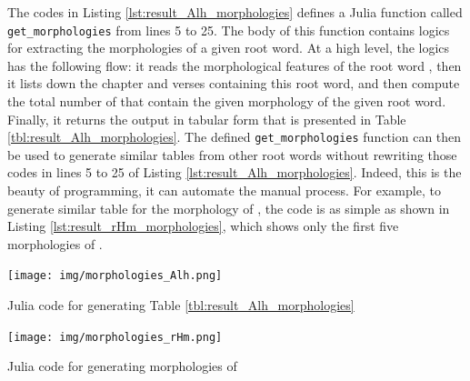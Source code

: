 The codes in Listing \ref{lst:result_Alh_morphologies} defines a Julia function called \verb|get_morphologies| from lines 5 to 25. The body of this function contains logics for extracting the morphologies of a given root word. At a high level, the logics has the following flow: it reads the morphological features of the root word , then it lists down the chapter and verses containing this root word, and then compute the total number of   that contain the given morphology of the given root word. Finally, it returns the output in tabular form that is presented in Table \ref{tbl:result_Alh_morphologies}. The defined \verb|get_morphologies| function can then be used to generate similar tables from other root words without rewriting those codes in lines 5 to 25 of Listing \ref{lst:result_Alh_morphologies}. Indeed, this is the beauty of programming, it can automate the manual process. For example, to generate similar table for the morphology of , the code is as simple as shown in Listing \ref{lst:result_rHm_morphologies}, which shows only the first five morphologies of .

\begin{listing2}[!t]
    \centering
    \texttt{[image: img/morphologies\_Alh.png]}
    \caption{Julia code for generating Table \ref{tbl:result_Alh_morphologies}}
    \label{lst:result_Alh_morphologies}
\end{listing2}

\begin{listing2}[!t]
    \centering
    \texttt{[image: img/morphologies\_rHm.png]}
    \caption{Julia code for generating morphologies of }
    \label{lst:result_rHm_morphologies}
\end{listing2}

